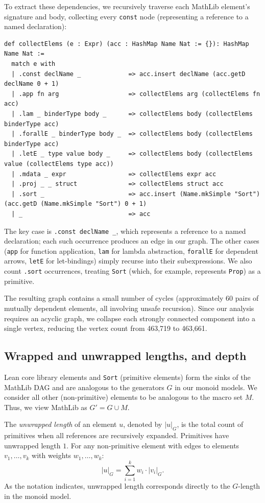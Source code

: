 \documentclass[12pt]{amsart}
\theoremstyle{definition}
\theoremstyle{remark}
\newcommand{\leaninline}[1]{\lstinline[style=lean]!#1!}
\begin{document}
To extract these dependencies, we recursively traverse each MathLib element's signature and body, collecting every \leaninline{const} node (representing a reference to a named declaration):
\begin{lstlisting}
def collectElems (e : Expr) (acc : HashMap Name Nat := {}): HashMap Name Nat :=
  match e with
  | .const declName _             => acc.insert declName (acc.getD declName 0 + 1)
  | .app fn arg                   => collectElems arg (collectElems fn acc)
  | .lam _ binderType body _      => collectElems body (collectElems binderType acc)
  | .forallE _ binderType body _  => collectElems body (collectElems binderType acc)
  | .letE _ type value body _     => collectElems body (collectElems value (collectElems type acc))
  | .mdata _ expr                 => collectElems expr acc
  | .proj _ _ struct              => collectElems struct acc
  | .sort _                       => acc.insert (Name.mkSimple "Sort") (acc.getD (Name.mkSimple "Sort") 0 + 1)
  | _                             => acc
\end{lstlisting}
The key case is \leaninline{.const declName _}, which represents a reference to a named declaration; each such occurrence produces an edge in our graph.
The other cases (\leaninline{app} for function application, \leaninline{lam} for lambda abstraction, \leaninline{forallE} for dependent arrows, \leaninline{letE} for let-bindings) simply recurse into their subexpressions.
We also count \leaninline{.sort} occurrences, treating \leaninline{Sort} (which, for example, represents \leaninline{Prop}) as a primitive.

The resulting graph contains a small number of cycles (approximately 60 pairs of mutually dependent elements, all involving unsafe recursion).
Since our analysis requires an acyclic graph, we collapse each strongly connected component into a single vertex, reducing the vertex count from 463,719 to 463,661.

\subsection{Wrapped and unwrapped lengths, and depth}

Lean core library elements and \leaninline{Sort} (primitive elements) form the sinks of the MathLib DAG and are analogous to the generators $G$ in our monoid models.
We consider all other (non-primitive) elements to be analogous to the macro set $M$. 
Thus, we view MathLib as $G' = G \cup M$.

The \emph{unwrapped length} of an element $u$, denoted by $|u|_G$, is the total count of primitives when all references are recursively expanded. 
Primitives have unwrapped length $1$. 
For any non-primitive element with edges to elements $v_1, \ldots, v_k$ with weights $w_1, \ldots, w_k$:
\[
|u|_G = \sum_{i=1}^{k} w_i \cdot |v_i|_G.
\]
As the notation indicates, unwrapped length corresponds directly to the $G$-length in the monoid model.
\end{document}
